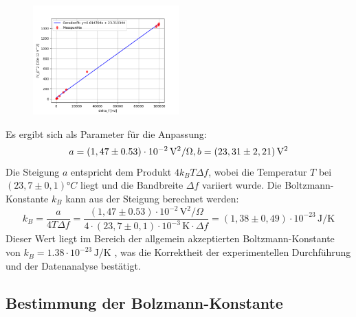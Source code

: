 \begin{figure}[htbp]
    \centering
    \includegraphics[width=0.5\textwidth]{figs/johnson_bandwith.png}
    \caption{}
    \label{fig:fit2}
\end{figure}
\FloatBarrier
Es ergibt sich als Parameter für die Anpassung:
\begin{equation}
a = (1,47 \pm 0.53) \cdot 10^{-2} \, \mathrm{V}^2/\Omega,   \\
b = (23,31 \pm 2,21) \, \mathrm{V}^2
\end{equation}
Die Steigung $a$ entspricht dem Produkt $4 k_B T \Delta f$, wobei die Temperatur $T$ bei $(23,7 \pm 0,1) °C$ liegt und die Bandbreite $\Delta f$ variiert wurde. Die Boltzmann-Konstante $k_B$ kann aus der Steigung berechnet werden:
\begin{equation}
k_B = \frac{a}{4 T \Delta f} = \frac{(1,47 \pm 0.53) \cdot 10^{-2} \,\mathrm{V}^2/\Omega}{4 \cdot (23,7 \pm 0,1) \cdot 10^{-3} \,\mathrm{K} \cdot \Delta f} = (1,38 \pm 0,49) \cdot 10^{-23} \,\mathrm{J/K}
\end{equation}
Dieser Wert liegt im Bereich der allgemein akzeptierten Boltzmann-Konstante von $k_B = 1.38 \cdot 10^{-23} \,\mathrm{J/K}$ \cite{} %
, was die Korrektheit der experimentellen Durchführung und der Datenanalyse bestätigt.
\subsection{Bestimmung der Bolzmann-Konstante}